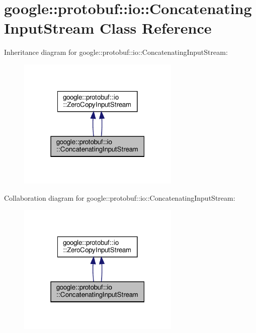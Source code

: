 \hypertarget{classgoogle_1_1protobuf_1_1io_1_1ConcatenatingInputStream}{}\section{google\+:\+:protobuf\+:\+:io\+:\+:Concatenating\+Input\+Stream Class Reference}
\label{classgoogle_1_1protobuf_1_1io_1_1ConcatenatingInputStream}


Inheritance diagram for google\+:\+:protobuf\+:\+:io\+:\+:Concatenating\+Input\+Stream\+:
\nopagebreak
\begin{figure}[H]
\begin{center}
\leavevmode
\includegraphics[width=219pt]{classgoogle_1_1protobuf_1_1io_1_1ConcatenatingInputStream__inherit__graph}
\end{center}
\end{figure}


Collaboration diagram for google\+:\+:protobuf\+:\+:io\+:\+:Concatenating\+Input\+Stream\+:
\nopagebreak
\begin{figure}[H]
\begin{center}
\leavevmode
\includegraphics[width=219pt]{classgoogle_1_1protobuf_1_1io_1_1ConcatenatingInputStream__coll__graph}
\end{center}
\end{figure}
